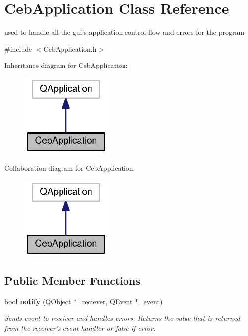 \section{Ceb\-Application Class Reference}
\label{class_ceb_application}


used to handle all the gui's application control flow and errors for the program  




{\ttfamily \#include $<$Ceb\-Application.\-h$>$}



Inheritance diagram for Ceb\-Application\-:\nopagebreak
\begin{figure}[H]
\begin{center}
\leavevmode
\includegraphics[width=126pt]{class_ceb_application__inherit__graph}
\end{center}
\end{figure}


Collaboration diagram for Ceb\-Application\-:\nopagebreak
\begin{figure}[H]
\begin{center}
\leavevmode
\includegraphics[width=126pt]{class_ceb_application__coll__graph}
\end{center}
\end{figure}
\subsection*{Public Member Functions}
\begin{DoxyCompactItemize}
\item 
bool {\bf notify} (Q\-Object $\ast$\-\_\-reciever, Q\-Event $\ast$\-\_\-event)
\begin{DoxyCompactList}\small\item\em Sends event to receiver and handles errors. Returns the value that is returned from the receiver's event handler or false if error. \end{DoxyCompactList}\end{DoxyCompactItemize}
